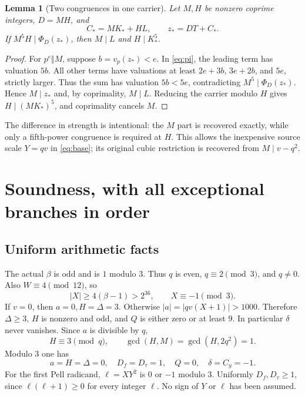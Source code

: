 \documentclass[11pt]{article}
\newtheorem{lemma}[theorem]{Lemma}\newtheorem{proposition}[theorem]{Proposition}
\theoremstyle{definition}\newtheorem{definition}[theorem]{Definition}
\theoremstyle{remark}\newtheorem{remark}[theorem]{Remark}
\begin{document}
\begin{lemma}[Two congruences in one carrier]\label{lem:carrier}
Let $M,H$ be nonzero coprime integers, $D=MH$, and
\[
 C_*=MK_*+HL,\qquad z_*=DT+C_*.
\]
If $M^5H\mid\Phi_D(z_*)$, then $M\mid L$ and $H\mid K_*^5$.
\end{lemma}
\begin{proof}
For $p^e\Vert M$, suppose $b=v_p(z_*)<e$. In \eqref{eq:pi}, the leading
term has valuation $5b$. All other terms have valuations at least
$2e+3b$, $3e+2b$, and $5e$, strictly larger. Thus the sum has valuation
$5b<5e$, contradicting $M^5\mid\Phi_D(z_*)$. Hence $M\mid z_*$ and,
by coprimality, $M\mid L$. Reducing the carrier modulo $H$ gives
$H\mid(MK_*)^5$, and coprimality cancels $M$.
\end{proof}

The difference in strength is intentional: the $M$ part is recovered
exactly, while only a fifth-power congruence is required at $H$. This
allows the inexpensive source scale $Y=qv$ in \eqref{eq:base}; its
original cubic restriction is recovered from $M\mid v-q^2$.

\section{Soundness, with all exceptional branches in order}
\label{sec:soundness}

\subsection{Uniform arithmetic facts}
The actual $\beta$ is odd and is $1$ modulo $3$. Thus $q$ is even,
$q\equiv2\pmod3$, and $q\ne0$. Also $W\equiv4\pmod{12}$, so
\begin{equation}\label{eq:xlarge}
 |X|\ge4(\beta-1)>2^{36},\qquad X\equiv-1\pmod3.
\end{equation}
If $v=0$, then $a=0,H=\Delta=3$. Otherwise
$|a|=|qv(X+1)|>1000$. Therefore $\Delta\ge3$, $H$ is nonzero and odd,
and $Q$ is either zero or at least $9$. In particular $\delta$ never
vanishes. Since $a$ is divisible by $q$,
\[
 H\equiv3\pmod q,\qquad \gcd(H,M)=\gcd(H,2q^2)=1.
\]
Modulo $3$ one has
\begin{equation}\label{eq:mod3}
 a=H=\Delta=0,\quad D_f=D_\tau=1,\quad
 Q=0,\quad\delta=C_y=-1.
\end{equation}
For the first Pell radicand, $\ell=XY^2$ is $0$ or $-1$ modulo $3$.
Uniformly $D_f,D_\tau\ge1$, since $\ell(\ell+1)\ge0$ for every integer
$\ell$. No sign of $Y$ or $\ell$ has been assumed.
\end{document}
